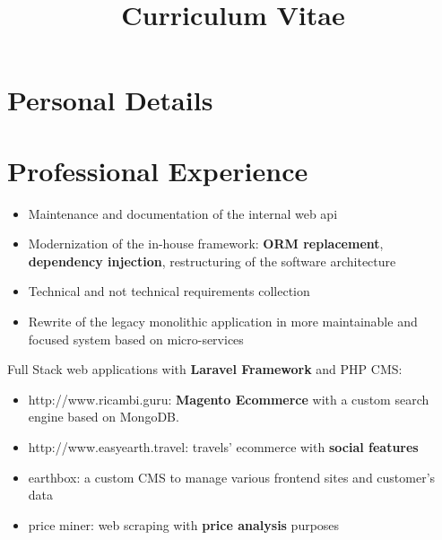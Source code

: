 \documentclass[11pt,a4paper,sans]{moderncv}        %
\title{Curriculum Vitae}                               %
\begin{document}
\makecvtitle



\section{Personal Details}




\section{Professional Experience}

{
\begin{itemize}
\item Maintenance and documentation of the internal web api 
\item Modernization of the in-house framework: \textbf{ORM replacement}, \textbf{dependency
  injection}, restructuring of the software architecture 
\item Technical and not technical requirements collection 
\item Rewrite of the legacy monolithic application in more maintainable
  and focused system based on micro-services 
\end{itemize}}

{Full Stack web applications with
  \textbf{Laravel Framework} and PHP CMS:
  \begin{itemize}
  \item http://www.ricambi.guru: \textbf{Magento Ecommerce} with a custom search engine
    based on MongoDB.
  \item http://www.easyearth.travel: travels' ecommerce with \textbf{social features}
  \item earthbox: a custom CMS to manage various frontend sites and
    customer's data
  \item price miner: web scraping with \textbf{price analysis} purposes
  \end{itemize}}
\end{document}
